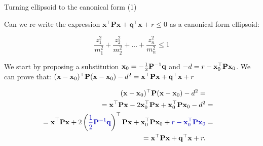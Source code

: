 \documentclass{beamer}
\begin{document}
\begin{frame}{Turning ellipsoid to the canonical form (1)}
	\begin{flushleft}
		
		Can we re-write the expression $\mathbf{x}^\top \mathbf{P} \mathbf{x} + \mathbf{q}^\top\mathbf{x} + r \leq 0$ as a canonical form ellipsoid:
		
		\begin{equation}
			\frac{z_1^2}{m_1^2} + \frac{z_2^2}{m_2^2} + ... + 
			\frac{z_n^2}{m_n^2} \leq 1
		\end{equation}
		
		We start by proposing a substitution $\mathbf{x}_0 = - \frac{1}{2}\mathbf{P}^{-1}\mathbf{q}$ and $-d = r - \mathbf{x}_0^\top \mathbf{P} \mathbf{x}_0$. We can prove that: $(\mathbf{x} - \mathbf{x}_0)^\top \mathbf{P}(\mathbf{x} - \mathbf{x}_0) - d^2 =
		\mathbf{x}^\top \mathbf{P} \mathbf{x} + \mathbf{q}^\top\mathbf{x} + r$
		
		\begin{align}
			(\bo{x} - \bo{x}_0)\T \bo{P}(\bo{x} - \bo{x}_0) - d^2 =
			\\
			= \bo{x}\T\bo{P}\bo{x} - 2\bo{x}_0\T\bo{P}\bo{x} + \bo{x}_0\T\bo{P}\bo{x}_0 - d^2 &=
			\\
			= \bo{x}\T\bo{P}\bo{x} + 2\left(\textcolor{mydarkblue}{\frac{1}{2}\bo{P}^{-1}\bo{q}}\right)\T\bo{P}\bo{x} + \bo{x}_0\T\bo{P}\bo{x}_0 + \textcolor{mydarkblue}{r - \bo{x}_0\T \bo{P} \bo{x}_0} &=
			\\
			= \bo{x}\T\bo{P}\bo{x} + \bo{q}\T \bo{x} + r.
		\end{align}
		
	\end{flushleft}
\end{frame}
\end{document}
